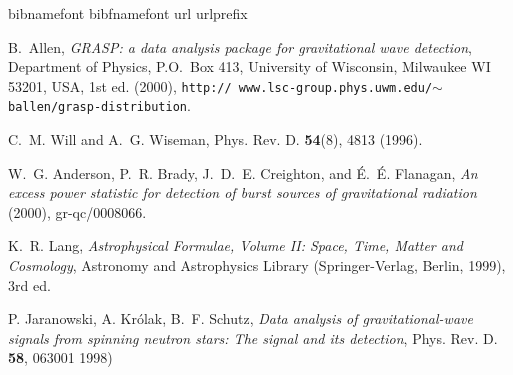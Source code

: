 \newpage
\newpage
\newpage
\newpage
\newpage
\newpage
\newpage
\newpage

\newpage\begin{thebibliography}{1}
\expandafter\ifx\csname bibnamefont\endcsname\relax
  \def\bibnamefont#1{#1}\fi
\expandafter\ifx\csname bibfnamefont\endcsname\relax
  \def\bibfnamefont#1{#1}\fi
\expandafter\ifx\csname url\endcsname\relax
  \def\url#1{\texttt{#1}}\fi
\expandafter\ifx\csname urlprefix\endcsname\relax\def\urlprefix{URL }\fi
\providecommand{\bibinfo}[2]{#2}
\providecommand{\eprint}[2][]{\url{#2}}

\bibinfo{author}{\bibfnamefont{B.}~\bibnamefont{Allen}},
  \emph{\bibinfo{title}{GRASP: a data analysis package for gravitational wave
  detection}}, \bibinfo{address}{Department of Physics, P.O.\ Box 413,
  University of Wisconsin, Milwaukee WI 53201, USA}, \bibinfo{edition}{1st} ed.
  (\bibinfo{year}{2000}), \bibinfo{note}{\texttt{http:\slash\slash
  www.lsc-group.phys.uwm.edu\slash$\sim$ballen\slash grasp-distribution}}.

\bibinfo{author}{\bibfnamefont{C.~M.} \bibnamefont{Will}} \bibnamefont{and}
  \bibinfo{author}{\bibfnamefont{A.~G.} \bibnamefont{Wiseman}},
  \bibinfo{journal}{Phys. Rev. D.}
  \textbf{\bibinfo{volume}{54}}(\bibinfo{number}{8}), \bibinfo{pages}{4813}
  (\bibinfo{year}{1996}).

\bibinfo{author}{\bibfnamefont{W.~G.} \bibnamefont{Anderson}},
  \bibinfo{author}{\bibfnamefont{P.~R.} \bibnamefont{Brady}},
  \bibinfo{author}{\bibfnamefont{J.~D.~E.} \bibnamefont{Creighton}},
  \bibnamefont{and} \bibinfo{author}{\bibfnamefont{\'E.~\'E.}
  \bibnamefont{Flanagan}}, \emph{\bibinfo{title}{An excess power statistic for
  detection of burst sources of gravitational radiation}}
  (\bibinfo{year}{2000}), \bibinfo{note}{gr-qc/0008066}.

\bibinfo{author}{\bibfnamefont{K.~R.} \bibnamefont{Lang}},
  \emph{\bibinfo{title}{Astrophysical Formulae, Volume II: Space, Time, Matter
  and Cosmology}}, Astronomy and Astrophysics Library
  (\bibinfo{publisher}{Springer-Verlag}, \bibinfo{address}{Berlin},
  \bibinfo{year}{1999}), \bibinfo{edition}{3rd} ed.

\bibinfo{author}{\bibfnamefont{P.} \bibnamefont{Jaranowski}},
\bibinfo{author}{\bibfnamefont{A.} \bibnamefont{Kr\'olak}},
\bibinfo{author}{\bibfnamefont{B.~F.} \bibnamefont{Schutz}},
  \emph{\bibinfo{title}{Data analysis of gravitational-wave signals
      from spinning neutron stars: The signal and its detection}},
  \bibinfo{journal}{Phys. Rev. D.}
  \textbf{\bibinfo{volume}{58}}, \bibinfo{pages}{063001}
  \bibinfo{year}{1998})

\end{thebibliography}
